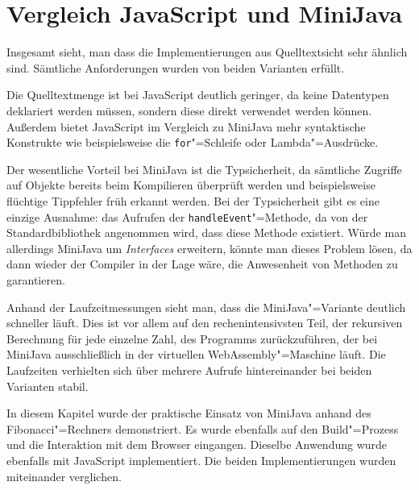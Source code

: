 \section{Vergleich JavaScript und MiniJava}

Insgesamt sieht, man dass die Implementierungen aus Quelltextsicht sehr ähnlich sind. Sämtliche Anforderungen wurden von beiden Varianten erfüllt.

Die Quelltextmenge ist bei JavaScript deutlich geringer, da keine Datentypen deklariert werden müssen, sondern diese direkt verwendet werden können. Außerdem bietet JavaScript im Vergleich zu MiniJava mehr syntaktische Konstrukte wie beispielsweise die \lstinline{for}"=Schleife oder Lambda"=Ausdrücke. 

Der wesentliche Vorteil bei MiniJava ist die Typsicherheit, da sämtliche Zugriffe auf Objekte bereits beim Kompilieren überprüft werden und beispielsweise flüchtige Tippfehler früh erkannt werden. Bei der Typsicherheit gibt es eine einzige Ausnahme: das Aufrufen der \lstinline{handleEvent}"=Methode, da von der Standardbibliothek angenommen wird, dass diese Methode existiert. Würde man allerdings MiniJava um \emph{Interfaces} erweitern, könnte man dieses Problem lösen, da dann wieder der Compiler in der Lage wäre, die Anwesenheit von Methoden zu garantieren.

Anhand der Laufzeitmessungen sieht man, dass die MiniJava"=Variante deutlich schneller läuft. Dies ist vor allem auf den rechenintensivsten Teil, der rekursiven Berechnung für jede einzelne Zahl, des Programms zurückzuführen, der bei MiniJava ausschließlich in der virtuellen WebAssembly"=Maschine läuft. Die Laufzeiten verhielten sich über mehrere Aufrufe hintereinander bei beiden Varianten stabil.

\vspace{4em}
In diesem Kapitel wurde der praktische Einsatz von MiniJava anhand des Fibonacci"=Rechners demonstriert. Es wurde ebenfalls auf den Build"=Prozess und die Interaktion mit dem Browser eingangen. Dieselbe Anwendung wurde ebenfalls mit JavaScript implementiert. Die beiden Implementierungen wurden miteinander verglichen.
